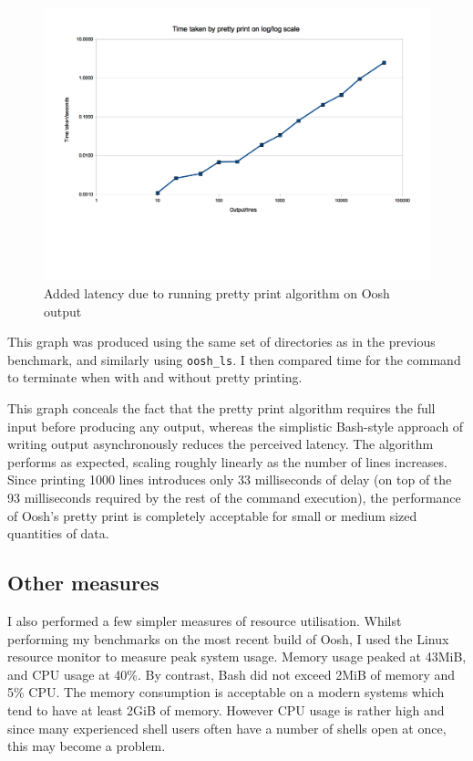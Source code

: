 \documentclass[12pt,twoside,notitlepage]{report}
\begin{document}
\begin{figure}[h]
\centering
\includegraphics[scale=0.5]{print_graph.png}
\caption{Added latency due to running pretty print algorithm on Oosh
  output}
\end{figure}

This graph was produced using the same set of directories as in the
previous benchmark, and similarly using {\tt oosh\_ls}. I then
compared time for the command to terminate when with and without
pretty printing.

This graph conceals the fact that the pretty print algorithm requires
the full input before producing any output, whereas the simplistic
Bash-style approach of writing output asynchronously reduces the
perceived latency. The algorithm performs as expected, scaling roughly
linearly as the number of lines increases. Since printing 1000 lines
introduces only 33 milliseconds of delay (on top of the 93
milliseconds required by the rest of the command execution), the
performance of Oosh's pretty print is completely acceptable for small
or medium sized quantities of data.

\subsection{Other measures}
\label{othermeasures}

I also performed a few simpler measures of resource
utilisation. Whilst performing my benchmarks on the most recent build
of Oosh, I used the Linux resource monitor to measure peak system
usage. Memory usage peaked at 43MiB, and CPU usage at 40\%. By
contrast, Bash did not exceed 2MiB of memory and 5\% CPU. The memory
consumption is acceptable on a modern systems which tend to have at
least 2GiB of memory. However CPU usage is rather high and since many
experienced shell users often have a number of shells open at once,
this may become a problem.
\end{document}
